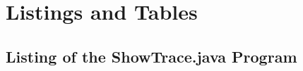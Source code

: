 %
%

\chapter{Listings and Tables}

\section{Listing of the ShowTrace.java Program}
\label{sec:ShowTracePrg}



